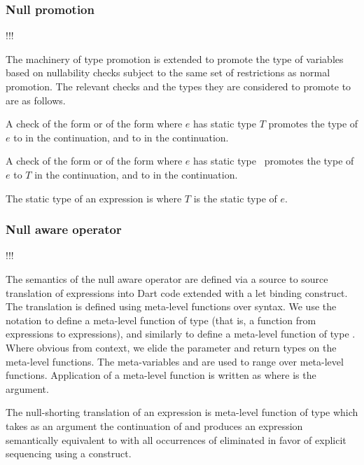 \documentclass[makeidx]{article}
\begin{document}
\subsubsection{Null promotion}
\LMLabel{}

!!!

The machinery of type promotion is extended to promote the type of
variables based on nullability checks subject to the same set of
restrictions as normal promotion.  The relevant checks and the types
they are considered to promote to are as follows.

A check of the form  or of the form
 where $e$ has static type $T$ promotes the
type of $e$ to  in the  continuation, and to
 in the  continuation.

A check of the form  or of the form
 where $e$ has static type
\ promotes the type of $e$ to $T$ in the 
continuation, and to  in the  continuation.

The static type of an expression  is 
where $T$ is the static type of $e$.

\subsubsection{Null aware operator}

!!!

The semantics of the null aware operator  are defined via a source to source
translation of expressions into Dart code extended with a let binding construct.
The translation is defined using meta-level functions over syntax.  We use the
notation  to define a meta-level function of type  (that is, a function from expressions to expressions), and similarly
 to define a meta-level function of type .  Where obvious from context, we elide the parameter and return
types on the meta-level functions.  The meta-variables  and  are used to
range over meta-level functions.  Application of a meta-level function is
written as  where  is the argument.

The null-shorting translation of an expression  is meta-level function  of
type  which takes as an argument the continuation of  and
produces an expression semantically equivalent to  with all occurrences of
 eliminated in favor of explicit sequencing using a  construct.
\end{document}
